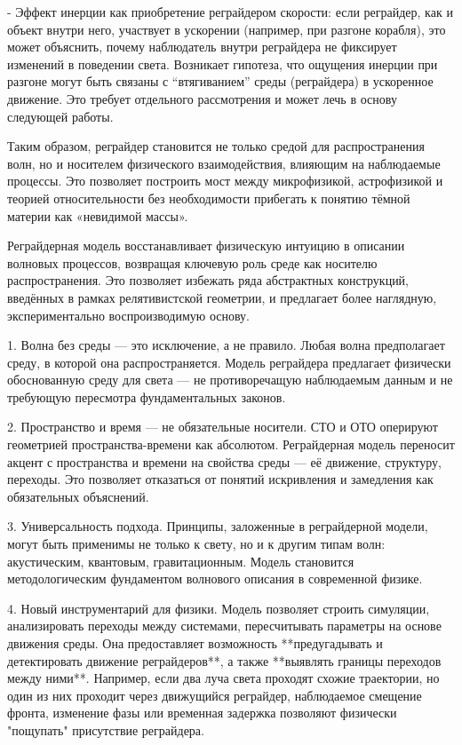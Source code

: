 \documentclass[12pt]{article}
\begin{document}
- Эффект инерции как приобретение реграйдером скорости: если реграйдер, как и объект внутри него, участвует в ускорении (например, при разгоне корабля), это может объяснить, почему наблюдатель внутри реграйдера не фиксирует изменений в поведении света. Возникает гипотеза, что ощущения инерции при разгоне могут быть связаны с “втягиванием” среды (реграйдера) в ускоренное движение. Это требует отдельного рассмотрения и может лечь в основу следующей работы.

Таким образом, реграйдер становится не только средой для распространения волн, но и носителем физического взаимодействия, влияющим на наблюдаемые процессы. Это позволяет построить мост между микрофизикой, астрофизикой и теорией относительности без необходимости прибегать к понятию тёмной материи как «невидимой массы».

Реграйдерная модель восстанавливает физическую интуицию в описании волновых процессов, возвращая ключевую роль среде как носителю распространения. Это позволяет избежать ряда абстрактных конструкций, введённых в рамках релятивистской геометрии, и предлагает более наглядную, экспериментально воспроизводимую основу.

1. Волна без среды — это исключение, а не правило.
Любая волна предполагает среду, в которой она распространяется. Модель реграйдера предлагает физически обоснованную среду для света — не противоречащую наблюдаемым данным и не требующую пересмотра фундаментальных законов.

2. Пространство и время — не обязательные носители.
СТО и ОТО оперируют геометрией пространства-времени как абсолютом. Реграйдерная модель переносит акцент с пространства и времени на свойства среды — её движение, структуру, переходы. Это позволяет отказаться от понятий искривления и замедления как обязательных объяснений.

3. Универсальность подхода.
Принципы, заложенные в реграйдерной модели, могут быть применимы не только к свету, но и к другим типам волн: акустическим, квантовым, гравитационным. Модель становится методологическим фундаментом волнового описания в современной физике.

4. Новый инструментарий для физики.
Модель позволяет строить симуляции, анализировать переходы между системами, пересчитывать параметры на основе движения среды. Она предоставляет возможность **предугадывать и детектировать движение реграйдеров**, а также **выявлять границы переходов между ними**. Например, если два луча света проходят схожие траектории, но один из них проходит через движущийся реграйдер, наблюдаемое смещение фронта, изменение фазы или временная задержка позволяют физически "пощупать" присутствие реграйдера.
\end{document}
